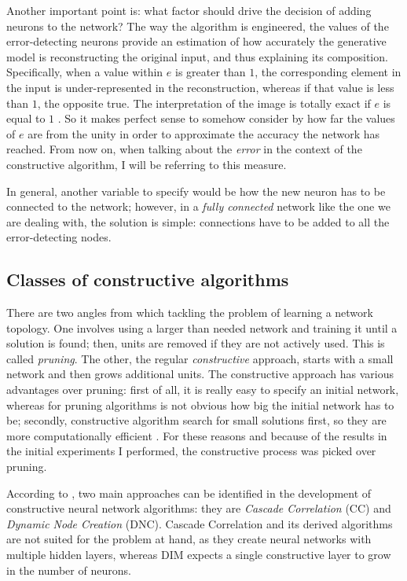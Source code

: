\documentclass[11pt,a4paper]{report}
\begin{document}
				Another important point is: what factor should drive the decision of adding neurons to the network? The way the algorithm is engineered, the values of the error-detecting neurons provide an estimation of how accurately the generative model is reconstructing the original input, and thus explaining its composition. Specifically, when a value within $e$ is greater than $1$, the corresponding element in the input is under-represented in the reconstruction, whereas if that value is less than $1$, the opposite true. The interpretation of the image is totally exact if $e$ is equal to $1$ \cite{spratling2009unsupervised}. So it makes perfect sense to somehow consider by how far the values of $e$ are from the unity in order to approximate the accuracy the network has reached. From now on, when talking about the \emph{error} in the context of the constructive algorithm, I will be referring to this measure.
			
				In general, another variable to specify would be how the new neuron has to be connected to the network; however, in a \emph{fully connected} network like the one we are dealing with, the solution is simple: connections have to be added to all the error-detecting nodes.
				
			\subsection{Classes of constructive algorithms}
				\label{sec:classes}
				
				There are two angles from which tackling the problem of learning a network topology. One involves using a larger than needed network and training it until a solution is found; then, units are removed if they are not actively used. This is called \emph{pruning}. The other, the regular \emph{constructive} approach, starts with a small network and then grows additional units. The constructive approach has various advantages over pruning: first of all, it is really easy to specify an initial network, whereas for pruning algorithms is not obvious how big the initial network has to be; secondly, constructive algorithm search for small solutions first, so they are more computationally efficient \cite{kwok1997objective}. For these reasons and because of the results in the initial experiments I performed, the constructive process was picked over pruning.
				
				According to \cite{fernandes2014constructive}, two main approaches can be identified in the development of constructive neural network algorithms: they are \emph{Cascade Correlation} (CC) and \emph{Dynamic Node Creation} (DNC). Cascade Correlation and its derived algorithms are not suited for the problem at hand, as they create neural networks with multiple hidden layers, whereas DIM expects a single constructive layer to grow in the number of neurons.
				
\end{document}
